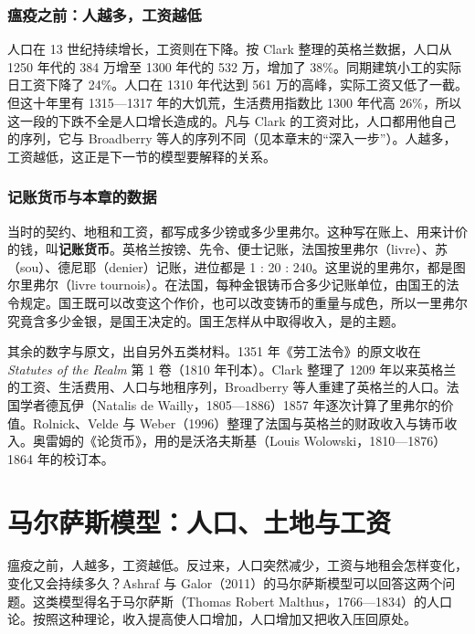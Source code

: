 \subsubsection{瘟疫之前：人越多，工资越低}
人口在 13 世纪持续增长，工资则在下降。按 Clark 整理的英格兰数据，人口从 1250 年代的 384 万增至 1300 年代的 532 万，增加了 38\%\cite{clark2010}。同期建筑小工的实际日工资下降了 24\%。人口在 1310 年代达到 561 万的高峰，实际工资又低了一截。但这十年里有 1315—1317 年的大饥荒，生活费用指数比 1300 年代高 26\%，所以这一段的下跌不全是人口增长造成的。凡与 Clark 的工资对比，人口都用他自己的序列，它与 Broadberry 等人的序列不同（见本章末的“深入一步”）。人越多，工资越低，这正是下一节的模型要解释的关系。

\subsubsection{记账货币与本章的数据}
当时的契约、地租和工资，都写成多少镑或多少里弗尔。这种写在账上、用来计价的钱，叫\textbf{记账货币}。英格兰按镑、先令、便士记账，法国按里弗尔（livre）、苏（sou）、德尼耶（denier）记账，进位都是 1 : 20 : 240。这里说的里弗尔，都是图尔里弗尔（livre tournois）。在法国，每种金银铸币合多少记账单位，由国王的法令规定。国王既可以改变这个作价，也可以改变铸币的重量与成色，所以一里弗尔究竟含多少金银，是国王决定的。国王怎样从中取得收入，是的主题。

其余的数字与原文，出自另外五类材料。1351 年《劳工法令》的原文收在 \emph{Statutes of the Realm} 第 1 卷（1810 年刊本）\cite{sotr1810}。Clark 整理了 1209 年以来英格兰的工资、生活费用、人口与地租序列\cite{clark2010}，Broadberry 等人重建了英格兰的人口\cite{broadberry2015}。法国学者德瓦伊（Natalis de Wailly，1805—1886）1857 年逐次计算了里弗尔的价值\cite{wailly1857}。Rolnick、Velde 与 Weber（1996）整理了法国与英格兰的财政收入与铸币收入\cite{rvw1996}。奥雷姆的《论货币》，用的是沃洛夫斯基（Louis Wolowski，1810—1876）1864 年的校订本\cite{oresme1864}。

\section{马尔萨斯模型：人口、土地与工资}\label{sec:medieval-malthus}

瘟疫之前，人越多，工资越低。反过来，人口突然减少，工资与地租会怎样变化，变化又会持续多久？Ashraf 与 Galor（2011）的马尔萨斯模型可以回答这两个问题\cite{ashrafgalor2011}。这类模型得名于马尔萨斯（Thomas Robert Malthus，1766—1834）的人口论。按照这种理论，收入提高使人口增加，人口增加又把收入压回原处。

